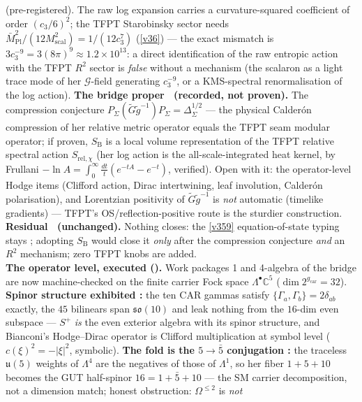 \documentclass[11pt,a4paper]{article}
\newcommand{\cthree}{c_3}
\newcommand{\Mpl}{\bar M_{\mathrm{Pl}}}
\newcommand{\gcar}{g_{\mathrm{car}}}
\begin{document}
\begin{keybox}
{(pre-registered).} The raw log expansion carries a curvature-squared coefficient of order
$(\cthree/6)^2$; the TFPT Starobinsky sector needs $\Mpl^2/(12M_{\mathrm{scal}}^2)=1/(12\cthree^7)$
(\vref{v36}) --- the exact mismatch is $3\cthree^{-9}=3(8\pi)^9\approx1.2\times10^{13}$: a direct
identification of the raw entropic action with the TFPT $R^2$ sector is \emph{false} without a mechanism
(the scalaron as a light trace mode of her $\mathcal G$-field generating $\cthree^{-9}$, or a KMS-spectral
renormalisation of the log action). \textbf{The bridge proper \mC\ (recorded, not proven).} The compression
conjecture $P_\Sigma(\widetilde G\widetilde g^{-1})P_\Sigma=\Delta_\Sigma^{1/2}$ --- the physical
Calder\'on compression of her relative metric operator equals the TFPT seam modular operator; if proven,
$S_{\mathrm B}$ is a local volume representation of the TFPT relative spectral action
$S_{\mathrm{rel},\chi}$ (her log action is the all-scale-integrated heat kernel, by Frullani
$-\ln A=\int_0^\infty\tfrac{dt}t(e^{-tA}-e^{-t})$, verified). Open with it: the operator-level Hodge items
(Clifford action, Dirac intertwining, leaf involution, Calder\'on polarisation), and Lorentzian positivity
of $\widetilde G\widetilde g^{-1}$ is \emph{not} automatic (timelike gradients) --- TFPT's
OS/reflection-positive route is the sturdier construction. \textbf{Residual \mO\ (unchanged).} Nothing
closes: the \vref{v359} equation-of-state typing stays \mO; adopting $S_{\mathrm B}$ would close it
\emph{only} after the compression conjecture \emph{and} an $R^2$ mechanism; zero TFPT knobs are added.
\smallskip\\
\noindent\textbf{The operator level, executed ().} Work packages
1 and 4-algebra of the bridge are now machine-checked on the finite carrier Fock space
$\Lambda^\bullet\mathbb C^5$ ($\dim 2^{\gcar}{=}32$). \textbf{Spinor structure exhibited \mE:} the ten
CAR gammas satisfy $\{\Gamma_a,\Gamma_b\}{=}2\delta_{ab}$ exactly, the $45$ bilinears span
$\mathfrak{so}(10)$ and leak nothing from the $16$-dim even subspace --- $S^+$ \emph{is} the even
exterior algebra with its spinor structure, and Bianconi's Hodge--Dirac operator is Clifford
multiplication at symbol level ($c(\xi)^2{=}-|\xi|^2$, symbolic). \textbf{The fold is the
$5{\to}\bar5$ conjugation \mE:} the traceless $\mathfrak u(5)$ weights of $\Lambda^4$ are the negatives
of those of $\Lambda^1$, so her fiber $1{+}5{+}10$ becomes the GUT half-spinor $16{=}1{+}\bar5{+}10$ ---
the SM carrier decomposition, not a dimension match; honest obstruction: $\Omega^{\le2}$ is \emph{not}

\end{keybox}
\end{document}
